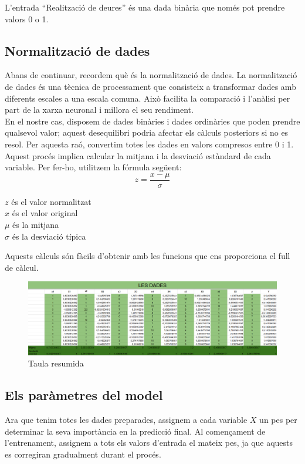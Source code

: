 L'entrada ``Realització de deures'' és una dada binària que només pot prendre valors 0 o 1.
\subsection{Normalització de dades}\label{subsec:24}
Abans de continuar, recordem què és la normalització de dades.
La normalització de dades és una tècnica de processament que consisteix a transformar dades amb diferents escales a una escala comuna. Això facilita la comparació i l’anàlisi per part de la xarxa neuronal i millora el seu rendiment. \\En el nostre cas, disposem de dades binàries i dades ordinàries que poden prendre qualsevol valor; aquest desequilibri podria afectar els càlculs posteriors si no es resol.
Per aquesta raó, convertim totes les dades en valors compresos entre 0 i 1. Aquest procés implica calcular la mitjana i la desviació estàndard de cada variable. Per fer-ho, utilitzem la fórmula següent:
$$z = \frac{x - \mu}{\sigma}$$
\begin{center}
    $z$ és el valor normalitzat\\
    $x$ és el valor original\\
    $\mu$ és la mitjana\\
    $\sigma$ és la desviació típica
\end{center}


Aquests càlculs són fàcils d'obtenir amb les funcions que ens proporciona el full de càlcul.

\begin{figure}[H]
    \centering
    \includegraphics[width=1\textwidth]{./figures/Dades_normalitzades.png}
    \caption{Taula resumida}
\end{figure}
\subsection{Els paràmetres del model}
Ara que tenim totes les dades preparades, assignem a cada variable $X$ un pes per determinar la seva importància en la predicció final. Al començament de l’entrenament, assignem a tots els valors d’entrada el mateix pes, ja que aquests es corregiran gradualment durant el procés.

